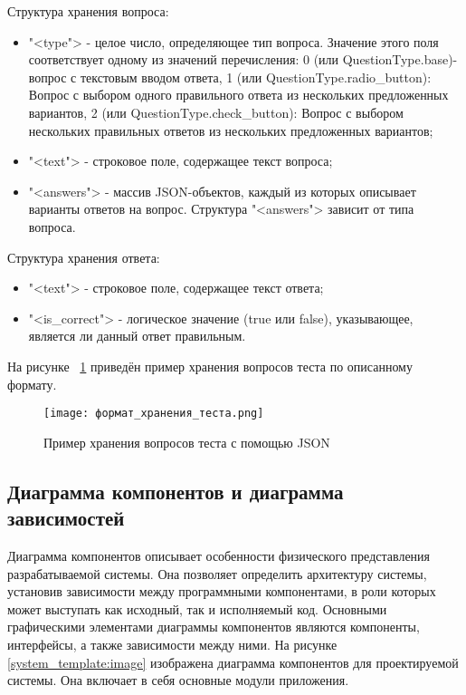 Структура хранения вопроса:
\begin{itemize}
	\item "<type"> - целое число, определяющее тип вопроса. Значение этого поля соответствует одному из значений перечисления: 0 (или QuestionType.base)- вопрос с текстовым вводом ответа, 1 (или QuestionType.radio\_button): Вопрос с выбором одного правильного ответа из нескольких предложенных вариантов, 2 (или QuestionType.check\_button): Вопрос с выбором нескольких правильных ответов из нескольких предложенных вариантов;
	\item "<text"> - строковое поле, содержащее текст вопроса;
	\item "<answers"> - массив JSON-объектов, каждый из которых описывает варианты ответов на вопрос. Структура "<answers"> зависит от типа вопроса.
\end{itemize}

Структура хранения ответа:
\begin{itemize}
	\item "<text"> - строковое поле, содержащее текст ответа;
	\item "<is\_correct"> - логическое значение (true или false), указывающее, является ли данный ответ правильным.
\end{itemize}

На рисунке ~\ref{question_storage_format:image} приведён пример хранения вопросов теста по описанному формату.

\begin{figure}[H]
	\centering
	\texttt{[image: формат\_хранения\_теста.png]}
	\caption{Пример хранения вопросов теста с помощью JSON}
	\label{question_storage_format:image}
\end{figure}

\subsection{Диаграмма компонентов и диаграмма зависимостей}

Диаграмма компонентов описывает особенности физического представления разрабатываемой системы. Она позволяет определить архитектуру системы, установив зависимости между программными компонентами, в роли которых может выступать как исходный, так и исполняемый код. Основными графическими элементами диаграммы компонентов являются компоненты, интерфейсы, а также зависимости между ними. На рисунке \ref{system_template:image} изображена диаграмма компонентов для проектируемой системы. Она включает в себя основные модули приложения. 

